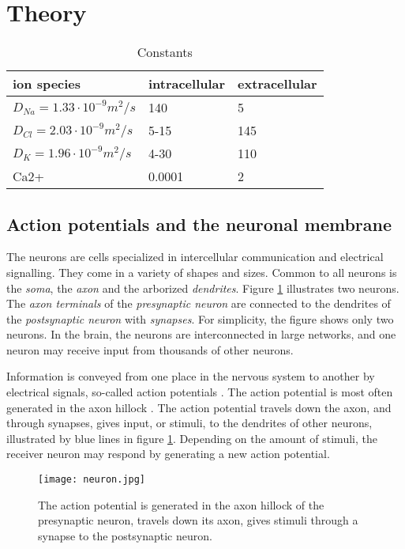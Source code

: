\documentclass{article}
\begin{document}
\section{Theory}
\begin{table}[h!]
  \centering
  \caption{Constants}
  \label{tab:constants}
  \begin{tabular}{l||l|l}
ion species & intracellular & extracellular \\
\hline
$D_{Na} = 1.33\cdot 10^{-9}m^2/s$ & 140 & 5  \\
$D_{Cl} = 2.03\cdot 10^{-9}m^2/s$ & 5-15 & 145 \\
$D_K = 1.96\cdot 10^{-9}m^2/s$ & 4-30 & 110 \\
Ca2+ & 0.0001 & 2  \\
 \end{tabular}
\end{table}

\subsection{Action potentials and the neuronal membrane}\label{APs,neuronal membrane, el.neutrality}
The neurons are cells specialized in intercellular communication and electrical signalling. They come in a variety of shapes and sizes. Common to all neurons is the \textit{soma}, the \textit{axon} and the arborized \textit{dendrites}. Figure  \ref{fig:neuron} illustrates two neurons. The \textit{axon terminals} of the \textit{presynaptic neuron} are connected to the dendrites of the \textit{postsynaptic neuron} with \textit{synapses}. For simplicity, the figure shows only two neurons. In the brain, the neurons are interconnected in large networks, and one neuron may receive input from thousands of other neurons.
  
Information is conveyed from one place in the nervous system to another by electrical signals, so-called action potentials \cite{Neuroscience}. The action potential is most often generated in the axon hillock \cite{newworldencyclopedia}. The action potential travels down the axon, and through synapses, gives input, or stimuli, to the dendrites of other neurons, illustrated by blue lines in figure \ref{fig:neuron}. Depending on the amount of stimuli, the receiver neuron may respond by generating a new action potential. 


\begin{figure}
  \texttt{[image: neuron.jpg]}
  \caption{The action potential is generated in the axon hillock of the presynaptic neuron, travels down its axon, gives stimuli through a synapse to the postsynaptic neuron. \cite{fig:neuron} }
  \label{fig:neuron}
\end{figure}
\end{document}
